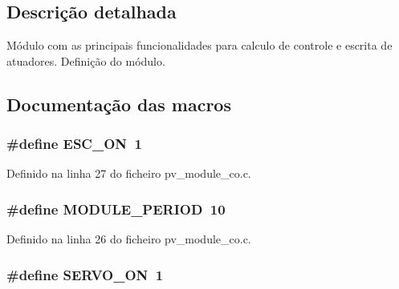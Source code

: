\subsection{Descrição detalhada}
Módulo com as principais funcionalidades para calculo de controle e escrita de atuadores. Definição do módulo. 

\subsection{Documentação das macros}
\hypertarget{group__app__co_gaec8246e954743c1eca3ed9d0b934bf8e}{
\subsubsection[{E\-S\-C\-\_\-\-O\-N}]{\setlength{\rightskip}{0pt plus 5cm}\#define E\-S\-C\-\_\-\-O\-N~1}}\label{group__app__co_gaec8246e954743c1eca3ed9d0b934bf8e}


Definido na linha 27 do ficheiro pv\-\_\-module\-\_\-co.\-c.

\hypertarget{group__app__co_ga0ac6c9f2991b096e49c354e5cce6fae0}{
\subsubsection[{M\-O\-D\-U\-L\-E\-\_\-\-P\-E\-R\-I\-O\-D}]{\setlength{\rightskip}{0pt plus 5cm}\#define M\-O\-D\-U\-L\-E\-\_\-\-P\-E\-R\-I\-O\-D~10}}\label{group__app__co_ga0ac6c9f2991b096e49c354e5cce6fae0}


Definido na linha 26 do ficheiro pv\-\_\-module\-\_\-co.\-c.

\hypertarget{group__app__co_ga162e9e4abd94f1558733bbf17fca28e9}{
\subsubsection[{S\-E\-R\-V\-O\-\_\-\-O\-N}]{\setlength{\rightskip}{0pt plus 5cm}\#define S\-E\-R\-V\-O\-\_\-\-O\-N~1}}\label{group__app__co_ga162e9e4abd94f1558733bbf17fca28e9}


